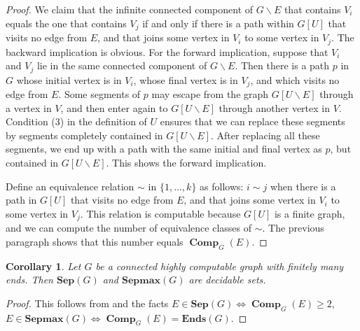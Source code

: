 \documentclass[10pt,A4]{amsart}
\newtheorem{cor}[thm]{Corollary}
\theoremstyle{definition}
\theoremstyle{definition}
\newcommand{\sep}[1]{\mathbf{Sep}({#1})}
\newcommand{\Ends}[1]{\mathbf{Ends}({#1})}
\newcommand{\sepmax}[1]{\mathbf{Sepmax}({#1})}
\newcommand{\comp}{\operatorname{\mathbf{Comp}}}
\begin{document}
\begin{proof}
    
    We claim that the infinite connected component of $G\smallsetminus E$ that contains $V_i$ equals the one that contains $V_j$ if and only if there is a path within $G[U]$ that visits no edge from $E$, and that joins some vertex in $V_i$ to some vertex in $V_j$. The backward implication is obvious. For the forward implication, suppose that $V_i$ and $V_j$ lie in the same connected component of $G\smallsetminus E$. Then there is a path $p$ in $G$ whose initial vertex is in $V_i$, whose final vertex is in $V_j$, and which visits no edge from $E$. 
    Some segments of $p$ may escape from the graph $G[U\smallsetminus E]$ through a vertex in $V$, and then enter again to $G[U\smallsetminus E]$ through another vertex in $V$. Condition (3) in the definition of $U$ ensures that we can replace these segments by segments completely contained in $G[U\smallsetminus E]$. After replacing all these segments, we end up with a path with the same initial and final vertex as $p$, but contained in $G[U\smallsetminus E]$. This shows the forward implication. 
    
    Define an equivalence relation $\sim$ in $\{1,\dots,k\}$ as follows: $i\sim j$ when there is a path in $G[U]$ that visits no edge from $E$, and that joins some vertex in $V_i$ to some vertex in $V_j$. This relation is computable because $G[U]$ is a finite graph, and we can compute the number of  equivalence classes of $\sim$. The previous paragraph shows that this number equals $\comp_G(E)$.
\end{proof} 



\begin{cor}\label{cor:sep-is-decidable-on-graphs-with-finitely-many-ends}
    Let $G$ be a connected highly computable graph with finitely many ends. Then $\sep{G}$ and $\sepmax{G}$ are decidable sets. 
\end{cor}
\begin{proof}
    This follows from  and the facts  $E\in\sep{G}\iff \comp_G(E)\geq 2$,  $E\in\sepmax{G}\iff \comp_G(E)=\Ends{G}$.  
\end{proof}
\end{document}
